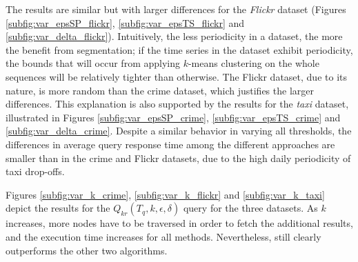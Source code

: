 The results are similar but with larger differences for the {\em Flickr} dataset (Figures \ref{subfig:var_epsSP_flickr}, \ref{subfig:var_epsTS_flickr} and \ref{subfig:var_delta_flickr}). Intuitively, the less periodicity in a dataset, the more the benefit from segmentation; if the time series in the dataset exhibit periodicity, the bounds that will occur from applying $k$-means clustering on the whole sequences will be relatively tighter than otherwise. The Flickr dataset, due to its nature, is more random than the crime dataset, which justifies the larger differences. This explanation is also supported by the results for the {\em taxi} dataset, illustrated in Figures \ref{subfig:var_epsSP_crime}, \ref{subfig:var_epsTS_crime} and \ref{subfig:var_delta_crime}. Despite a similar behavior in varying all thresholds, the differences in average query response time among the different approaches are smaller than in the crime and Flickr datasets, due to the high daily periodicity of taxi drop-offs.


Figures \ref{subfig:var_k_crime}, \ref{subfig:var_k_flickr} and \ref{subfig:var_k_taxi} depict the results for the $Q_{kr}(T_q, k, \epsilon, \delta)$ query for the three datasets. As $k$ increases, more nodes have to be traversed in order to fetch the additional results, and the execution time increases for all methods. Nevertheless, \sbtsr still clearly outperforms the other two algorithms.

